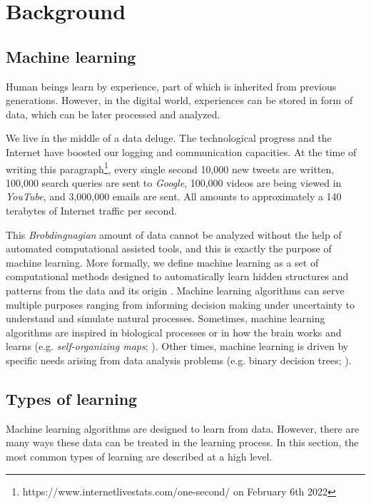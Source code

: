 \chapter{Background} \label{ch:background}
\section{Machine learning}
Human beings learn by experience, part of which is inherited from previous generations. However, in the digital world, experiences can be stored in form of data, which can be later processed and analyzed.

We live in the middle of a data deluge. The technological progress and the Internet have boosted our logging and communication capacities. At the time of writing this paragraph\footnote{https://www.internetlivestats.com/one-second/ on February 6th 2022}, every single second 10,000 new tweets are written, 100,000 search queries are sent to \textit{Google}, 100,000 videos are being viewed in \textit{YouTube}, and 3,000,000 emails are sent. All amounts to approximately a 140 terabytes of Internet traffic per second.

This \textit{Brobdingnagian} amount of data cannot be analyzed without the help of automated computational assisted tools, and this is exactly the purpose of machine learning. More formally, we define machine learning as a set of computational methods designed to automatically learn hidden structures and patterns from the data and its origin \autocite{murphy2012, theodoridis2015}. Machine learning algorithms can serve multiple purposes ranging from informing decision making under uncertainty to understand and simulate natural processes. Sometimes, machine learning algorithms are inspired in biological processes \autocite{haykin1998} or in how the brain works and learns (e.g. \textit{self-organizing maps}; \citealp{kohonen2001}). Other times, machine learning is driven by specific needs arising from data analysis problems (e.g. binary decision trees; \citealp{hastie2009, hastie2014}).

\section{Types of learning}
Machine learning algorithms are designed to learn from data. However, there are many ways these data can be treated in the learning process. In this section, the most common types of learning are described at a high level.

